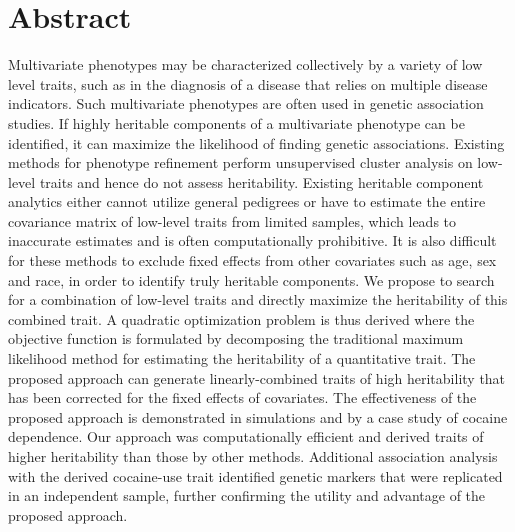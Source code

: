 \documentclass[10pt,letterpaper]{article}
\begin{document}
\section*{Abstract}
Multivariate phenotypes may be characterized collectively by a variety of low level traits, such as in the diagnosis of a disease that relies on multiple disease indicators. Such multivariate phenotypes are often used in genetic association studies. If highly heritable components of a multivariate phenotype can be identified, it can maximize the likelihood of finding genetic associations. Existing methods for phenotype refinement perform unsupervised cluster analysis on low-level traits and hence do not assess heritability. Existing heritable component analytics either cannot utilize general pedigrees or have to estimate the entire covariance matrix of low-level traits from limited samples, which leads to inaccurate estimates and is often computationally prohibitive. It is also difficult for these methods to exclude fixed effects from other covariates such as age, sex and race, in order to identify truly heritable components. We propose to search for a combination of low-level traits and directly maximize the heritability of this combined trait. A quadratic optimization problem is thus derived where the objective function is formulated by decomposing the traditional maximum likelihood method for estimating the heritability of a quantitative trait. The proposed approach can generate linearly-combined traits of high heritability that has been corrected for the fixed effects of covariates. The effectiveness of the proposed approach is demonstrated in simulations and by a case study of cocaine dependence. Our approach was computationally efficient and derived traits of higher heritability than those by other methods. Additional association analysis with the derived cocaine-use trait identified genetic markers that were replicated in an independent sample, further confirming the utility and advantage of the proposed approach. 




\linenumbers
\end{document}
